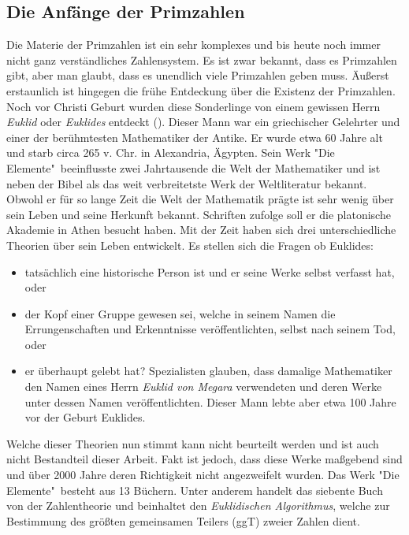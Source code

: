 \documentclass[12pt,a4paper]{article}
\theoremstyle{definition}
\begin{document}
\subsection{Die Anfänge der Primzahlen}\label{Die Anfänge der Primzahlen}
Die Materie der Primzahlen ist ein sehr komplexes und bis heute noch immer nicht ganz verständliches Zahlensystem.
Es ist zwar bekannt, dass es Primzahlen gibt, aber man glaubt, dass es unendlich viele Primzahlen geben muss.
Äußerst erstaunlich ist hingegen die frühe Entdeckung über die Existenz der Primzahlen.
Noch vor Christi Geburt wurden diese Sonderlinge von einem gewissen Herrn \textit{Euklid} oder \textit{Euklides} entdeckt (\cite[22]{Remmert1995}).
Dieser Mann war ein griechischer Gelehrter und einer der berühmtesten Mathematiker der Antike.
Er wurde etwa 60 Jahre alt und starb circa 265 v. Chr. in Alexandria, Ägypten.
Sein Werk "Die Elemente"\ beeinflusste zwei Jahrtausende die Welt der Mathematiker und ist neben der Bibel als das weit verbreitetste Werk der Weltliteratur bekannt.
Obwohl er für so lange Zeit die Welt der Mathematik prägte ist sehr wenig über sein Leben und seine Herkunft bekannt.
Schriften zufolge soll er die platonische Akademie in Athen besucht haben.
Mit der Zeit haben sich drei unterschiedliche Theorien über sein Leben entwickelt.
Es stellen sich die Fragen ob Euklides:
\begin{itemize}
\item tatsächlich eine historische Person ist und er seine Werke selbst verfasst hat, oder
\item der Kopf einer Gruppe gewesen sei, welche in seinem Namen die Errungenschaften und Erkenntnisse veröffentlichten, selbst nach seinem Tod, oder
\item er überhaupt gelebt hat?
Spezialisten glauben, dass damalige Mathematiker den Namen eines Herrn \textit{Euklid von Megara} verwendeten und deren Werke unter dessen Namen veröffentlichten.
Dieser Mann lebte aber etwa 100 Jahre vor der Geburt Euklides.
\end{itemize}
Welche dieser Theorien nun stimmt kann nicht beurteilt werden und ist auch nicht Bestandteil dieser Arbeit.
Fakt ist jedoch, dass diese Werke maßgebend sind und über 2000 Jahre deren Richtigkeit nicht angezweifelt wurden.
Das Werk "Die Elemente"\ besteht aus 13 Büchern.
Unter anderem handelt das siebente Buch von der Zahlentheorie und beinhaltet den \textit{Euklidischen Algorithmus}, welche zur Bestimmung des größten gemeinsamen Teilers (ggT) zweier Zahlen dient.
\end{document}

